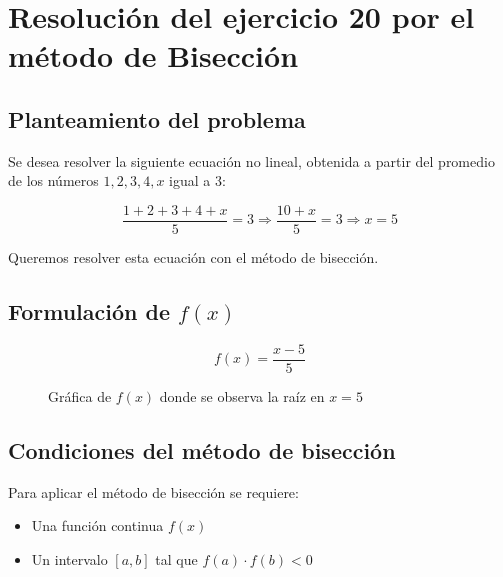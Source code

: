 \documentclass[12pt]{article}
\begin{document}




\section*{Resolución del ejercicio 20 por el método de Bisección}

\subsection*{Planteamiento del problema}

Se desea resolver la siguiente ecuación no lineal, obtenida a partir del promedio de los números $1, 2, 3, 4, x$ igual a 3:

\[
\frac{1 + 2 + 3 + 4 + x}{5} = 3
\Rightarrow \frac{10 + x}{5} = 3
\Rightarrow x = 5
\]

Queremos resolver esta ecuación con el método de bisección.

\subsection*{Formulación de $f(x)$}

\[
f(x) = \frac{x - 5}{5}
\]

\begin{figure}[H]
\centering
{}
\caption{Gráfica de $f(x)$ donde se observa la raíz en $x = 5$}
\end{figure}

\subsection*{Condiciones del método de bisección}

Para aplicar el método de bisección se requiere:

\begin{itemize}
  \item Una función continua $f(x)$
  \item Un intervalo $[a, b]$ tal que $f(a) \cdot f(b) < 0$
\end{itemize}
\end{document}
